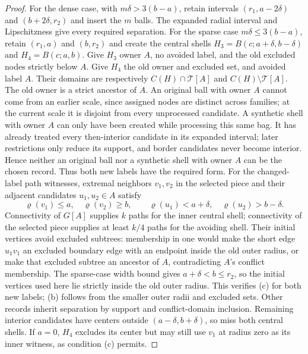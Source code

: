 \begin{proof}
For the dense case, with $m\delta>3(b-a)$, retain intervals
$(r_1,a-2\delta)$ and $(b+2\delta,r_2)$ and insert the $m$ balls.
The expanded radial interval and Lipschitzness give every required
separation.  For the sparse case $m\delta\le3(b-a)$, retain
$(r_1,a)$ and $(b,r_2)$ and create the central shells
$H_3=B(c;a+\delta,b-\delta)$ and $H_4=B(c;a,b)$.
Give $H_3$ owner $A$, no avoided label, and the old excluded nodes
strictly below $A$.  Give $H_4$ the old owner and excluded set,
and avoided label $A$.  Their domains are respectively
$C(H)\cap\mathcal T[A]$ and $C(H)\setminus\mathcal T[A]$.
The old owner is a strict ancestor of $A$.  An original ball with
owner $A$ cannot come from an earlier scale, since assigned nodes
are distinct across families; at the current scale it is disjoint
from every unprocessed candidate.  A synthetic shell with owner
$A$ can only have been created while processing this same bag.
It has already treated every then-interior candidate in its expanded
interval; later restrictions only reduce its support, and border
candidates never become interior.  Hence neither an original ball
nor a synthetic shell with owner $A$ can be the chosen record.
Thus both new labels have the required form.
For the changed-label path witnesses, extremal neighbors
$v_1,v_2$ in the selected piece and their adjacent candidates
$u_1,u_2\in A$ satisfy
\[
 \varrho(v_1)\le a,\quad \varrho(v_2)\ge b,\qquad
 \varrho(u_1)<a+\delta,\quad \varrho(u_2)>b-\delta.
\]
Connectivity of $G[A]$ supplies $k$ paths for the inner central
shell; connectivity of the selected piece supplies at least
$k/4$ paths for the avoiding shell.  Their initial vertices
avoid excluded subtrees: membership in one would make the
short edge $u_1v_1$ an excluded boundary edge with an endpoint
inside the old outer radius, or make that excluded subtree an
ancestor of $A$, contradicting $A$'s conflict membership.
The sparse-case width bound gives $a+\delta<b\le r_2$, so the
initial vertices used here lie strictly inside the old outer radius.
This verifies (c) for both new labels; (b) follows from the smaller
outer radii and excluded sets.  Other records inherit separation by support and
conflict-domain inclusion.  Remaining interior candidates have centers
outside $(a-\delta,b+\delta)$, so miss both central shells.
If $a=0$, $H_4$ excludes its center but may still use $v_1$ at
radius zero as its inner witness, as condition (c) permits.


\end{proof}

